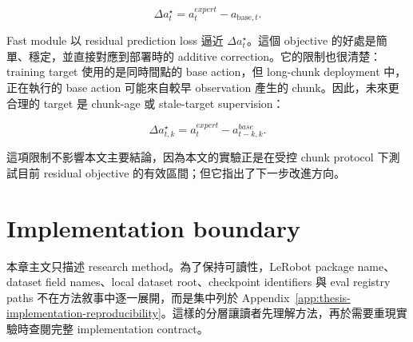 \begin{equation}
  \Delta a^\star_t = a^{expert}_t-a_{\mathrm{base},t}.
  \label{eq:target_delta}
\end{equation}

Fast module 以 residual prediction loss 逼近 $\Delta a^\star_t$。這個 objective 的好處是簡單、穩定，並直接對應到部署時的 additive correction。它的限制也很清楚：training target 使用的是同時間點的 base action，但 long-chunk deployment 中，正在執行的 base action 可能來自較早 observation 產生的 chunk。因此，未來更合理的 target 是 chunk-age 或 stale-target supervision：

\begin{equation}
  \Delta a^\star_{t,k}=a^{expert}_t-a^{base}_{t-k,k}.
\end{equation}

這項限制不影響本文主要結論，因為本文的實驗正是在受控 chunk protocol 下測試目前 residual objective 的有效區間；但它指出了下一步改進方向。

\section{Implementation boundary}

本章主文只描述 research method。為了保持可讀性，LeRobot package name、dataset field names、local dataset root、checkpoint identifiers 與 eval registry paths 不在方法敘事中逐一展開，而是集中列於 Appendix~\ref{app:thesis-implementation-reproducibility}。這樣的分層讓讀者先理解方法，再於需要重現實驗時查閱完整 implementation contract。

